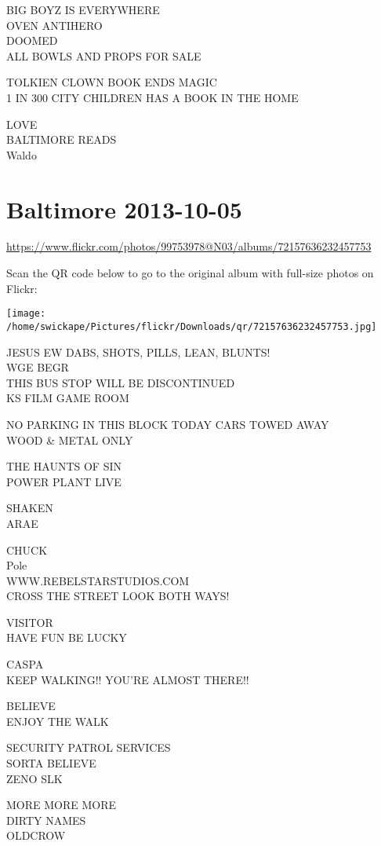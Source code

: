 \documentclass[10pt,letterpaper]{article}
\begin{document}
BIG BOYZ IS EVERYWHERE\\
OVEN ANTIHERO\\
DOOMED\\
ALL BOWLS AND PROPS FOR SALE

TOLKIEN CLOWN BOOK ENDS MAGIC\\
1 IN 300 CITY CHILDREN HAS A BOOK IN THE HOME

LOVE\\
BALTIMORE READS\\
Waldo


\section*{Baltimore 2013-10-05}

\url{https://www.flickr.com/photos/99753978@N03/albums/72157636232457753}

Scan the QR code below to go to the original album with full-size photos on Flickr:

\texttt{[image: /home/swickape/Pictures/flickr/Downloads/qr/72157636232457753.jpg]}


JESUS EW DABS, SHOTS, PILLS, LEAN, BLUNTS!\\
WGE BEGR\\
THIS BUS STOP WILL BE DISCONTINUED\\
KS FILM GAME ROOM

NO PARKING IN THIS BLOCK TODAY CARS TOWED AWAY\\
WOOD \& METAL ONLY

THE HAUNTS OF SIN\\
POWER PLANT LIVE

SHAKEN\\
ARAE

CHUCK\\
Pole\\
WWW.REBELSTARSTUDIOS.COM\\
CROSS THE STREET LOOK BOTH WAYS!

VISITOR\\
HAVE FUN BE LUCKY

CASPA\\
KEEP WALKING!! YOU'RE ALMOST THERE!!

BELIEVE\\
ENJOY THE WALK

SECURITY PATROL SERVICES\\
SORTA BELIEVE\\
ZENO SLK

MORE MORE MORE\\
DIRTY NAMES\\
OLDCROW
\end{document}

